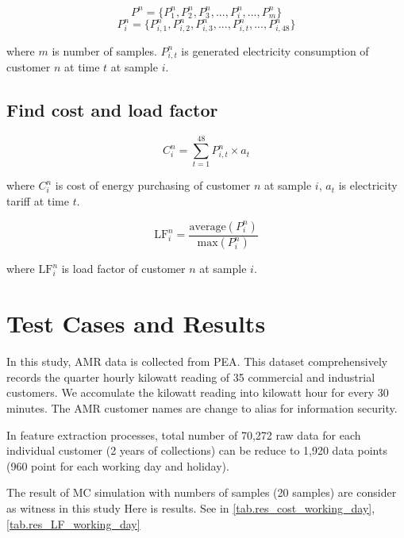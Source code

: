 \documentclass[conference]{IEEEtran}
\begin{document}
\begin{equation}
P^{n}=\big\{ P_{1}^{n}, P_{2}^{n}, P_{3}^{n}, ..., P_{i}^{n}, ..., P_{m}^{n}\big\}
\label{eq.generated_kW_cust_n}
\end{equation}
\begin{equation}
P_{i}^{n}=\big\{ P_{i,1}^{n}, P_{i,2}^{n}, P_{i,3}^{n}, ..., P_{i,t}^{n}, ..., P_{i,48}^{n}\big\}
\label{eq.generated_kW_cust_n_at_sample_i}
\end{equation}

where $m$ is number of samples. $P_{i,t}^{n}$ is generated electricity consumption of customer $n$ at time $t$ at sample $i$.


\subsection{Find cost and load factor}


\begin{equation}
C_{i}^{n}=\sum_{t=1}^{48}   P_{i,t}^{n} \times a_{t}
\label{eq.cost}
\end{equation}

where $C_{i}^{n}$ is cost of energy purchasing of customer $n$ at sample $i$, $a_{t}$ is electricity tariff at time $t$.

\begin{equation}
\text{LF}_{i}^{n}=\frac{\text{average}(P_{i}^{n})}{\text{max}(P_{i}^{n})}
\label{eq.load_factor}
\end{equation}

where $\text{LF}_{i}^{n}$ is load factor of customer $n$ at sample $i$.

\section{Test Cases and Results}
In this study, AMR data is collected from PEA. This dataset comprehensively records the quarter hourly kilowatt reading of 35 commercial and industrial customers. We accomulate the kilowatt reading into kilowatt hour for every 30 minutes. The AMR customer names are change to alias for information security.

In feature extraction processes, total number of 70,272 raw data for each individual customer (2 years of collections) can be reduce to 1,920 data points (960 point for each working day and holiday).


The result of MC simulation with numbers of samples (20 samples) are consider as witness in this study
Here is results. See in \ref{tab.res_cost_working_day}, \ref{tab.res_LF_working_day}
\end{document}
